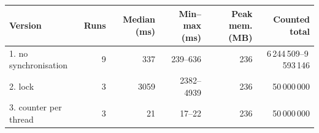 \begin{tabular}{lrrrrr}
\toprule
Version & Runs & Median (ms) & Min--max (ms) & Peak mem. (MB) & Counted total \\
\midrule
1. no synchronisation & 9 & 337 & 239--636 & 236 & 6\,244\,509--9\,593\,146 \\
2. lock & 3 & 3059 & 2382--4939 & 236 & 50\,000\,000 \\
3. counter per thread & 3 & 21 & 17--22 & 236 & 50\,000\,000 \\
\bottomrule
\end{tabular}
